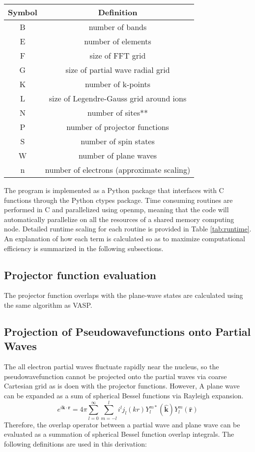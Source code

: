 \documentclass[12pt]{article}
\begin{document}
\begin{table}
\begin{tabular}{c|c}
Symbol & Definition\\
\hline
B & number of bands\\
E & number of elements\\
F & size of FFT grid\\
G & size of partial wave radial grid\\
K & number of k-points\\
L & size of Legendre-Gauss grid around ions\\
N & number of sites**\\
P & number of projector functions\\
S & number of spin states\\
W & number of plane waves\\
n & number of electrons (approximate scaling)
\end{tabular}
\end{table}

The program is implemented as a Python package that interfaces with C functions through
the Python ctypes package. Time consuming routines are performed in C and parallelized
using openmp, meaning that the code will automatically parallelize on all the resources
of a shared memory computing node. Detailed runtime scaling for each routine is
provided in Table \ref{tab:runtime}. An explanation of how each term is calculated
so as to maximize computational efficiency is summarized in the following subsections.

\subsection{Projector function evaluation}

The projector function overlaps with the plane-wave states are calculated using the same
algorithm as VASP.\cite{vasp}

\subsection{Projection of Pseudowavefunctions onto Partial Waves}

The all electron partial waves fluctuate rapidly near the nucleus,
so the pseudowavefunction cannot be projected onto the partial waves
via coarse Cartesian grid as is doen with the projector functions.
However, A plane wave can be expanded as a sum of spherical
Bessel functions via Rayleigh expansion.
\begin{equation}
e^{i\mathbf{k} \cdot \mathbf{r}} = 4\pi \sum_{l=0}^{\infty}\sum_{m=-l}^{l}
i^l j_l(kr)Y_l^{m*}(\mathbf{\hat{k}})Y_l^m(\mathbf{\hat{r}})
\label{eq:pwexp}
\end{equation}
Therefore, the overlap operator between a partial wave and plane wave can be evaluated as a summation
of spherical Bessel function overlap integrals. The following definitions are
used in this derivation:
\end{document}

